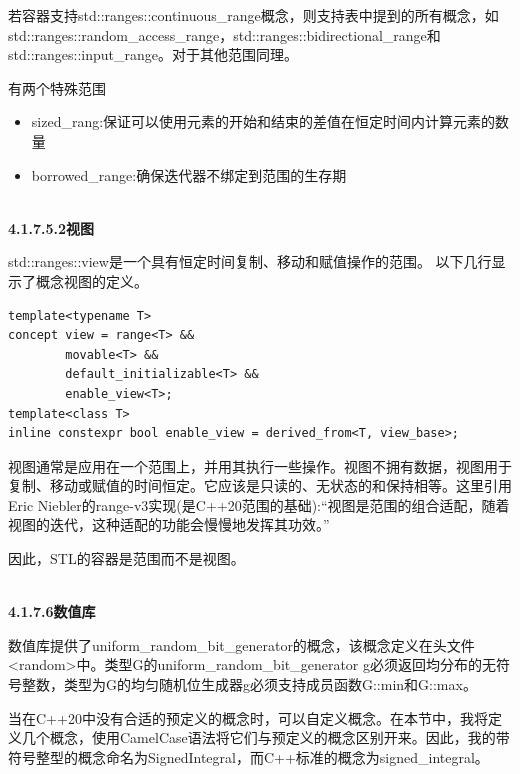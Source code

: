 若容器支持std::ranges::continuous\_range概念，则支持表中提到的所有概念，如std::ranges::random\_access\_range，std::ranges::bidirectional\_range和std::ranges::input\_range。对于其他范围同理。

有两个特殊范围

\begin{itemize}
\item
sized\_rang:保证可以使用元素的开始和结束的差值在恒定时间内计算元素的数量

\item
borrowed\_range:确保迭代器不绑定到范围的生存期
\end{itemize}

\hspace*{\fill} \\ %
\noindent
\textbf{4.1.7.5.2\hspace{0.2cm}视图}

std::ranges::view是一个具有恒定时间复制、移动和赋值操作的范围。
以下几行显示了概念视图的定义。

\begin{lstlisting}[style=styleCXX]
template<typename T>
concept view = range<T> &&
		movable<T> &&
		default_initializable<T> &&
		enable_view<T>;
template<class T>
inline constexpr bool enable_view = derived_from<T, view_base>;
\end{lstlisting}

视图通常是应用在一个范围上，并用其执行一些操作。视图不拥有数据，视图用于复制、移动或赋值的时间恒定。它应该是只读的、无状态的和保持相等。这里引用Eric Niebler的range-v3实现(是C++20范围的基础):“视图是范围的组合适配，随着视图的迭代，这种适配的功能会慢慢地发挥其功效。”

因此，STL的容器是范围而不是视图。

\hspace*{\fill} \\ %
\noindent
\textbf{4.1.7.6\hspace{0.2cm}数值库}

数值库提供了uniform\_random\_bit\_generator的概念，该概念定义在头文件<random>中。类型G的uniform\_random\_bit\_generator g必须返回均分布的无符号整数，类型为G的均匀随机位生成器g必须支持成员函数G::min和G::max。


当在C++20中没有合适的预定义的概念时，可以自定义概念。在本节中，我将定义几个概念，使用CamelCase语法将它们与预定义的概念区别开来。因此，我的带符号整型的概念命名为SignedIntegral，而C++标准的概念为signed\_integral。

